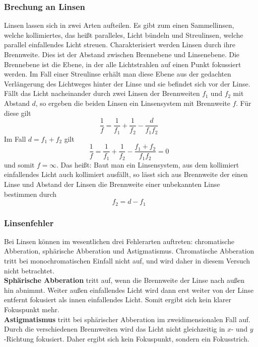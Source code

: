 \subsubsection{Brechung an Linsen}
Linsen lassen sich in zwei Arten aufteilen. Es gibt zum einen Sammellinsen, welche kollimiertes, das heißt paralleles, Licht bündeln und Streulinsen, welche parallel einfallendes Licht streuen. Charakterisiert werden Linsen durch ihre Brennweite. Dies ist der Abstand zwischen Brennebene und Linsenebene. Die Brennebene ist die Ebene, in der alle Lichtstrahlen auf einen Punkt fokussiert werden. Im Fall einer Streulinse erhält man diese Ebene aus der gedachten Verlängerung des Lichtweges hinter der Linse und sie befindet sich vor der Linse.\\
Fällt das Licht nacheinander durch zwei Linsen der Brennweiten $ f_1 $ und $ f_2 $ mit Abstand $ d $, so ergeben die beiden Linsen ein Linsensystem mit Brennweite $ f $. Für diese gilt
\begin{equation}
	\frac{1}{f} = \frac{1}{f_1} + \frac{1}{f_2} - \frac{d}{f_1f_2}
\end{equation}
Im Fall $ d = f_1+f_2 $ gilt 
\begin{equation}
	\frac{1}{f} = \frac{1}{f_1} + \frac{1}{f_2} - \frac{f_1 + f_2}{f_1f_2} = 0
\end{equation}
und somit $ f = \infty $. Das heißt: Baut man ein Linsensystem, aus dem kollimiert einfallendes Licht auch kollimiert ausfällt, so lässt sich aus Brennweite der einen Linse und Abstand der Linsen die Brennweite einer unbekannten Linse bestimmen durch
\begin{equation}
	f_2 = d - f_1 \label{eq:linse}
\end{equation}

\subsubsection{Linsenfehler}
Bei Linsen können im wesentlichen drei Fehlerarten auftreten: chromatische Abberation, sphärische Abberation und Astigmatismus. Chromatische Abberation tritt bei monochromatischen Einfall nicht auf, und wird daher in diesem Versuch nicht betrachtet. \\
\textbf{Sphärische Abberation} tritt auf, wenn die Brennweite der Linse nach außen hin abnimmt. Weiter außen einfallendes Licht wird dann erst weiter von der Linse entfernt fokusiert als innen einfallendes Licht. Somit ergibt sich kein klarer Fokuspunkt mehr. \\
\textbf{Astigmatismus} tritt bei sphärischer Abberation im zweidimensionalen Fall auf. Durch die verschiedenen Brennweiten wird das Licht nicht gleichzeitig in $ x $- und $ y $-Richtung fokusiert. Daher ergibt sich kein Fokuspunkt, sondern ein Fokusstrich.

